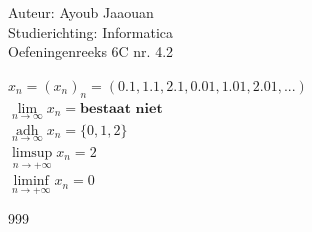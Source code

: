 \documentclass[a4paper]{article}
\begin{document}
\noindent \large Auteur: Ayoub Jaaouan \\
\noindent \large Studierichting: Informatica\\
\noindent \large Oefeningenreeks 6C nr. 4.2\\
\medskip

\normalsize


$x_n = (x_n)_n = (0.1, 1.1, 2.1, 0.01, 1.01, 2.01,...)$ \\

$\lim\limits_{n \to \infty} x_n = \textbf{bestaat niet}$\\


$\underset{n \to \infty}{\operatorname{adh}} x_n = \{0,1,2\}$ \\

$\limsup\limits_{n \to +\infty} x_n = 2 $\\

$\liminf\limits_{n \to +\infty} x_n = 0$ \\

\begin{thebibliography}{999}
\end{thebibliography}
\end{document}
